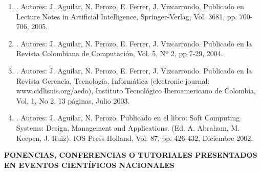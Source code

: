 \begin{enumerate}
\item {}. Autores: J. Aguilar, N. Perozo, E. Ferrer, J. Vizcarrondo, Publicado en Lecture Notes in Artificial Intelligence, Springer-Verlag, Vol. 3681, pp. 700-706, 2005.
\item {}. Autores: J. Aguilar, N. Perozo, E. Ferrer, J. Vizcarrondo. Publicado en la Revista Colombiana de Computación, Vol. 5, Nº 2, pp 7-29, 2004.
\item {}. Autores: J. Aguilar, N. Perozo, E. Ferrer, J. Vizcarrondo. Publicado en la Revista Gerencia, Tecnología, Informática (electronic journal: www.cidlisuis.org/aedo), Instituto Tecnológico Iberoamericano de Colombia, Vol. 1, No 2, 13 páginas, Julio 2003.
\item {}. Autores: J. Aguilar, N. Perozo. Publicado en el libro: Soft Computing Systems: Design, Management and Applications. (Ed. A. Abraham, M. Keepen, J. Ruiz). IOS Press Holland, Vol. 87, pp. 426-432, Diciembre 2002.
\end{enumerate}

\espaciotriple

\noindent\textbf{PONENCIAS, CONFERENCIAS O TUTORIALES PRESENTADOS EN
EVENTOS CIENTÍFICOS NACIONALES}

